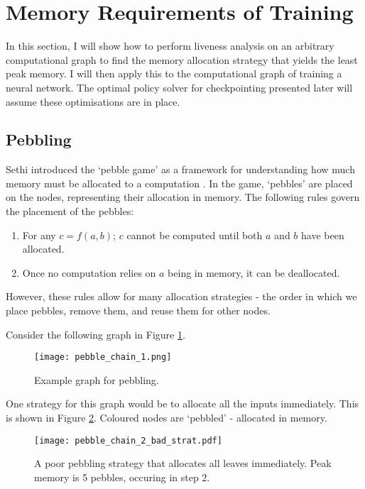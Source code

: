 \section{Memory Requirements of Training} \label{sec:2-4-memory-analysis}
In this section, I will show how to perform liveness analysis on an arbitrary computational graph to find the memory allocation strategy that yields the least peak memory.
I will then apply this to the computational graph of training a neural network.
The optimal policy solver for checkpointing presented later will assume these optimisations are in place.

\subsection{Pebbling}
Sethi introduced the `pebble game' as a framework for understanding how much memory must be allocated to a computation \cite{Sethi1973}.
In the game, `pebbles' are placed on the nodes, representing their allocation in memory.
The following rules govern the placement of the pebbles:
\begin{enumerate}[topsep=0.1em]
    \item For any \(c = f(a, b)\); \(c\) cannot be computed until both \(a\) and \(b\) have been allocated.
    \item Once no computation relies on \(a\) being in memory, it can be deallocated.
\end{enumerate}
However, these rules allow for many allocation strategies - the order in which we place pebbles, remove them, and reuse them for other nodes.

Consider the following graph in Figure \ref{fig:2-chain-to-pebble}.

\begin{figure}[h]
    \centering
    \texttt{[image: pebble\_chain\_1.png]}
    \caption{Example graph for pebbling.}
    \label{fig:2-chain-to-pebble}
\end{figure}

One strategy for this graph would be to allocate all the inputs immediately.
This is shown in Figure \ref{fig:2-pebble-chain-bad}.
Coloured nodes are `pebbled' - allocated in memory.

\begin{figure}[hp]
    \centering
    \texttt{[image: pebble\_chain\_2\_bad\_strat.pdf]}
    \caption{A poor pebbling strategy that allocates all leaves immediately. Peak memory is 5 pebbles, occuring in step 2.}
    \label{fig:2-pebble-chain-bad}
\end{figure}

